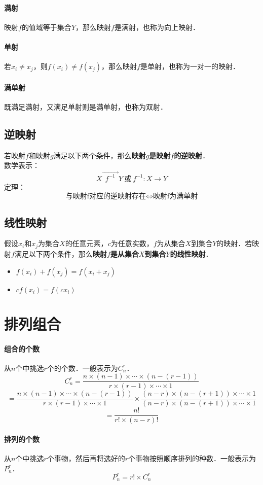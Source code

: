\documentclass[12pt]{article}
\begin{document}
\begin{CJK}{UTF8}{gbsn}
\paragraph{满射}
映射$f$的值域等于集合$Y$，那么映射$f$是满射，也称为向上映射．
\paragraph{单射}
若$x_i \neq x_j$，则$f(x_i) \neq f(x_j)$，那么映射$f$是单射，也称为一对一的映射．
\paragraph{满单射}
既满足满射，又满足单射则是满单射，也称为双射．
\subsection{逆映射}
若映射$f$和映射$g$满足以下两个条件，那么\textbf{映射$g$是映射$f$的逆映射}．\\
数学表示：
$$X \overrightarrow{\ \ f^{-1}\ \ }Y\ \text{或}\ f^{-1}:X\rightarrow Y$$
定理：
$$\text{与映射f对应的逆映射存在}\Leftrightarrow\text{映射f为满单射}$$
\subsection{线性映射}
假设$x_i$和$x_j$为集合$X$的任意元素，$c$为任意实数，$f$为从集合$X$到集合$Y$的映射．若映射$f$满足以下两个条件，那么\textbf{映射$f$是从集合$X$到集合$Y$的线性映射}．
\begin{itemize}
\item $f(x_i)+f(x_j) = f(x_i+x_j)$
\item $cf(x_i)=f(cx_i)$
\end{itemize}

\section{排列组合}
\paragraph{组合的个数}
从$n$个中挑选$r$个的个数．一般表示为$C_n^r$．
$$C_n^r=\dfrac{n\times(n-1)\times\cdots\times(n-(r-1))}{r\times(r-1)\times\cdots\times 1}$$
$$=\dfrac{n\times(n-1)\times\cdots\times(n-(r-1))}{r\times(r-1)\times\cdots\times 1}\times\dfrac{(n-r)\times(n-(r+1))\times\cdots\times 1}{(n-r)\times(n-(r+1))\times\cdots\times 1}$$
$$=\dfrac{n!}{r!\times(n-r)!}$$
\paragraph{排列的个数}
从$n$个中挑选$r$个事物，然后再将选好的$r$个事物按照顺序排列的种数．一般表示为$P_n^r$．
$$P_n^r=r!\times C_n^r$$

\end{CJK}
\end{document}
